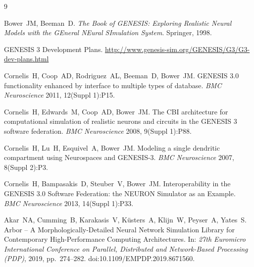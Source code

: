 \documentclass[preprint,12pt, a4paper]{elsarticle}
\begin{document}




\begin{thebibliography}{9}

Bower~JM, Beeman~D.
\textit{The Book of GENESIS: Exploring Realistic Neural Models with the GEneral NEural SImulation System}.
Springer, 1998.

GENESIS 3 Development Plans.
\url{http://www.genesis-sim.org/GENESIS/G3/G3-dev-plans.html}

Cornelis~H, Coop~AD, Rodriguez~AL, Beeman~D, Bower~JM.
GENESIS 3.0 functionality enhanced by interface to multiple types of database.
\textit{BMC Neuroscience} 2011, 12(Suppl 1):P15.

Cornelis~H, Edwards~M, Coop~AD, Bower~JM.
The CBI architecture for computational simulation of realistic neurons and circuits in the GENESIS 3 software federation.
\textit{BMC Neuroscience} 2008, 9(Suppl 1):P88.

Cornelis~H, Lu~H, Esquivel~A, Bower~JM.
Modeling a single dendritic compartment using Neurospaces and GENESIS-3.
\textit{BMC Neuroscience} 2007, 8(Suppl 2):P3.

Cornelis~H, Bampasakis~D, Steuber~V, Bower~JM.
Interoperability in the GENESIS 3.0 Software Federation: the NEURON Simulator as an Example.
\textit{BMC Neuroscience} 2013, 14(Suppl 1):P33.

Akar~NA, Cumming~B, Karakasis~V, K\"usters~A, Klijn~W, Peyser~A, Yates~S.
Arbor -- A Morphologically-Detailed Neural Network Simulation Library for Contemporary High-Performance Computing Architectures.
In: \textit{27th Euromicro International Conference on Parallel, Distributed and Network-Based Processing (PDP)}, 2019, pp.~274--282. doi:10.1109/EMPDP.2019.8671560.


\end{thebibliography}
\end{document}
